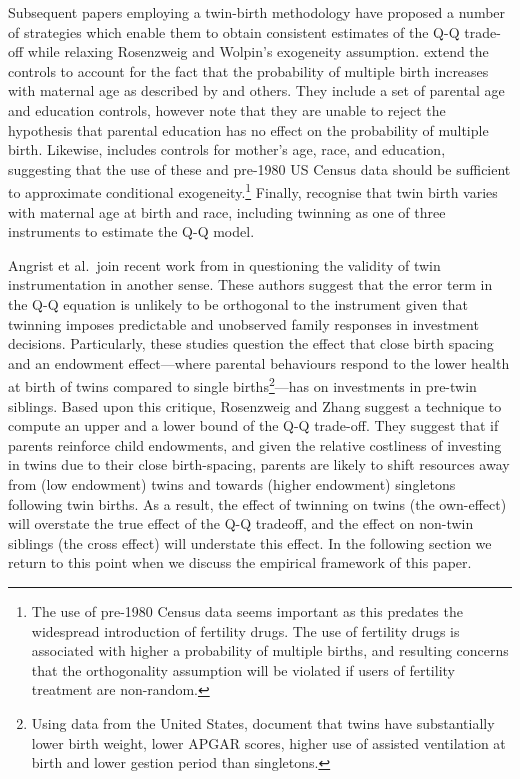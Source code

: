 \documentclass{article}[12pt,subeqn]
\begin{document}
\begin{spacing}{1.5}
Subsequent papers employing a twin-birth methodology have proposed a number of strategies which enable them to obtain consistent estimates of 
the Q-Q trade-off while relaxing Rosenzweig and Wolpin's exogeneity assumption.  \citet{Blacketal2005} extend the controls to account for the 
fact that the probability of multiple birth increases with maternal age as described by \citet{Jacobsenetal1999} and others.  They include a 
set of parental age and education controls, however note that they are unable to reject the hypothesis that parental education has no effect 
on the probability of multiple birth.  Likewise, \citet{Caceres2006} includes controls for mother's age, race, and education, suggesting that 
the use of these and pre-1980 US Census data should be sufficient to approximate conditional exogeneity.\footnote{The use of pre-1980 Census 
data seems important as this predates the widespread introduction of fertility drugs.  The use of fertility drugs is associated with higher a 
probability of multiple births, and resulting concerns that the orthogonality assumption will be violated if users of fertility treatment are 
non-random.}  Finally, \citet{Angristetal2010} recognise that twin birth varies with maternal age at birth and race, including twinning as 
one of three instruments to estimate the Q-Q model. 

Angrist et al.\ join recent work from \citet{RosenzweigZhang2009} in questioning the validity of twin instrumentation in another sense.  These 
authors suggest that the error term in the Q-Q equation is unlikely to be orthogonal to the instrument given that twinning imposes predictable 
and unobserved family responses in investment decisions.  Particularly, these studies question the effect that close birth spacing and an endowment 
effect---where parental behaviours respond to the lower health at birth of twins compared to single births\footnote{Using data from the United States, \citet{Almondetal2005} 
document that twins have substantially lower birth weight, lower APGAR scores, higher use of assisted ventilation at birth and lower gestion period 
than singletons.}---has on investments in pre-twin siblings.  Based upon this critique, Rosenzweig and Zhang suggest a technique to compute an upper 
and a lower bound of the Q-Q trade-off.  They suggest that if parents reinforce child endowments, and given the relative costliness of investing
in twins due to their close birth-spacing, parents are likely to shift resources away from (low endowment) twins and towards 
(higher endowment) singletons following twin births.  As a result, the effect of twinning on twins (the own-effect) will overstate the true effect of the Q-Q tradeoff, 
and the effect on non-twin siblings (the cross effect) will understate this effect.  In the following section we return to this point when we discuss
the empirical framework of this paper.


\end{spacing}
\end{document}
